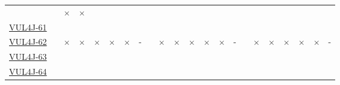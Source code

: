 \begin{table}[!htbp]
{\begin{tabular}{|l|lll|ll|ll||lll|ll|ll||lll|ll|ll|}
		\cellcolor{yellow}\halfcheckmark & \cellcolor{green}\checkmark & \cellcolor{red}$\times$ & \cellcolor{red}$\times$\\ 
		\href{https://github.com/neo4j-contrib/neo4j-apoc-procedures/commit/45bc09c8bd7f17283e2a7e85ce3f02cb4be4fd1a}{VUL4J-61} & \cellcolor{green}\checkmark & \cellcolor{green}\checkmark & \cellcolor{green}\checkmark & \cellcolor{green}\checkmark & \cellcolor{green}\checkmark & \cellcolor{green}\checkmark & \cellcolor{green}\checkmark  & \cellcolor{green}\checkmark & \cellcolor{green}\checkmark & \cellcolor{green}\checkmark & \cellcolor{green}\checkmark & \cellcolor{green}\checkmark & \cellcolor{green}\checkmark & \cellcolor{green}\checkmark     & \cellcolor{green}\checkmark & \cellcolor{green}\checkmark & \cellcolor{green}\checkmark & \cellcolor{green}\checkmark & \cellcolor{green}\checkmark & \cellcolor{green}\checkmark & \cellcolor{green}\checkmark\\ 
		\href{https://github.com/neo4j/neo4j/commit/46de5d01ae2741ffe04c36270fc62c6d490f65c9}{VUL4J-62} & \cellcolor{green}\checkmark & \cellcolor{red}$\times$ & \cellcolor{red}$\times$ & \cellcolor{red}$\times$ & \cellcolor{red}$\times$ & \cellcolor{red}$\times$ & \cellcolor{lightgray}-  & \cellcolor{green}\checkmark & \cellcolor{red}$\times$ & \cellcolor{red}$\times$ & \cellcolor{red}$\times$ & \cellcolor{red}$\times$ & \cellcolor{red}$\times$ & \cellcolor{lightgray}-     & \cellcolor{green}\checkmark & \cellcolor{red}$\times$ & \cellcolor{red}$\times$ & \cellcolor{red}$\times$ & \cellcolor{red}$\times$ & \cellcolor{red}$\times$ & \cellcolor{lightgray}-\\ 
		\href{https://github.com/opennetworkinglab/onos/commit/1a783729a1d7e0cd59d59a8dd3a73cdd6ac0f30d}{VUL4J-63} & \cellcolor{green}\checkmark & \cellcolor{green}\checkmark & \cellcolor{green}\checkmark & \cellcolor{green}\checkmark & \cellcolor{green}\checkmark & \cellcolor{green}\checkmark & \cellcolor{green}\checkmark  & \cellcolor{green}\checkmark & \cellcolor{green}\checkmark & \cellcolor{green}\checkmark & \cellcolor{green}\checkmark & \cellcolor{green}\checkmark & \cellcolor{green}\checkmark & \cellcolor{green}\checkmark     & \cellcolor{green}\checkmark & \cellcolor{green}\checkmark & \cellcolor{green}\checkmark & \cellcolor{green}\checkmark & \cellcolor{green}\checkmark & \cellcolor{green}\checkmark & \cellcolor{green}\checkmark\\ 
		\href{https://github.com/OpenRefine/OpenRefine/commit/6a0d7d56e4ffb420316ce7849fde881344fbf881}{VUL4J-64} & \cellcolor{green}\checkmark & \cellcolor{green}\checkmark & \cellcolor{green}\checkmark & \cellcolor{green}\checkmark & \cellcolor{green}\checkmark & \cellcolor{green}\checkmark & \cellcolor{green}\checkmark  & \cellcolor{green}\checkmark & \cellcolor{green}\checkmark & \cellcolor{green}\checkmark & \cellcolor{green}\checkmark & \cellcolor{green}\checkmark & \cellcolor{green}\checkmark & \cellcolor{green}\checkmark     & \cellcolor{green}\checkmark & \cellcolor{green}\checkmark & \cellcolor{green}\checkmark & \cellcolor{green}\checkmark & \cellcolor{green}\checkmark & \cellcolor{green}\checkmark & \cellcolor{green}\checkmark\\ 

\end{tabular}}
\end{table}
